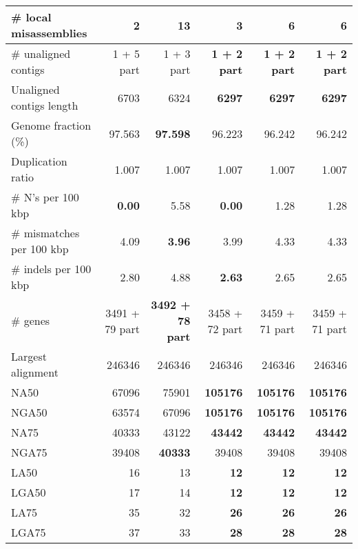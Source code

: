 \documentclass[12pt,a4paper]{article}
\begin{document}
\begin{table}[ht]
\begin{center}
\begin{tabular}{|l*{5}{|r}|}
\# local misassemblies & {\bf 2} & 13 & 3 & 6 & 6 \\ \hline
\# unaligned contigs & 1 + 5 part & 1 + 3 part & {\bf 1 + 2 part} & {\bf 1 + 2 part} & {\bf 1 + 2 part} \\ \hline
Unaligned contigs length & 6703 & 6324 & {\bf 6297} & {\bf 6297} & {\bf 6297} \\ \hline
Genome fraction (\%) & 97.563 & {\bf 97.598} & 96.223 & 96.242 & 96.242 \\ \hline
Duplication ratio & 1.007 & 1.007 & 1.007 & 1.007 & 1.007 \\ \hline
\# N's per 100 kbp & {\bf 0.00} & 5.58 & {\bf 0.00} & 1.28 & 1.28 \\ \hline
\# mismatches per 100 kbp & 4.09 & {\bf 3.96} & 3.99 & 4.33 & 4.33 \\ \hline
\# indels per 100 kbp & 2.80 & 4.88 & {\bf 2.63} & 2.65 & 2.65 \\ \hline
\# genes & 3491 + 79 part & {\bf 3492 + 78 part} & 3458 + 72 part & 3459 + 71 part & 3459 + 71 part \\ \hline
Largest alignment & 246346 & 246346 & 246346 & 246346 & 246346 \\ \hline
NA50 & 67096 & 75901 & {\bf 105176} & {\bf 105176} & {\bf 105176} \\ \hline
NGA50 & 63574 & 67096 & {\bf 105176} & {\bf 105176} & {\bf 105176} \\ \hline
NA75 & 40333 & 43122 & {\bf 43442} & {\bf 43442} & {\bf 43442} \\ \hline
NGA75 & 39408 & {\bf 40333} & 39408 & 39408 & 39408 \\ \hline
LA50 & 16 & 13 & {\bf 12} & {\bf 12} & {\bf 12} \\ \hline
LGA50 & 17 & 14 & {\bf 12} & {\bf 12} & {\bf 12} \\ \hline
LA75 & 35 & 32 & {\bf 26} & {\bf 26} & {\bf 26} \\ \hline
LGA75 & 37 & 33 & {\bf 28} & {\bf 28} & {\bf 28} \\ \hline
\end{tabular}
\end{center}
\end{table}
\end{document}
